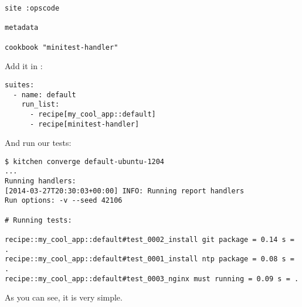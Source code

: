\begin{lstlisting}[label=lst:testing-minitest5]
site :opscode

metadata

cookbook "minitest-handler"
\end{lstlisting}

Add it in :

\begin{lstlisting}[label=lst:testing-minitest6]
suites:
  - name: default
    run_list:
      - recipe[my_cool_app::default]
      - recipe[minitest-handler]
\end{lstlisting}

And run our tests:

\begin{lstlisting}[label=lst:testing-minitest6]
$ kitchen converge default-ubuntu-1204
...
Running handlers:
[2014-03-27T20:30:03+00:00] INFO: Running report handlers
Run options: -v --seed 42106

# Running tests:

recipe::my_cool_app::default#test_0002_install git package = 0.14 s = .
recipe::my_cool_app::default#test_0001_install ntp package = 0.08 s = .
recipe::my_cool_app::default#test_0003_nginx must running = 0.09 s = .
\end{lstlisting}

As you can see, it is very simple.